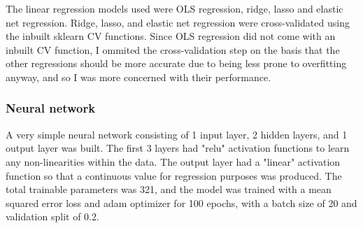\documentclass[11pt]{article}
\begin{document}
The linear regression models used were OLS regression, ridge, lasso and
elastic net regression. Ridge, lasso, and elastic net regression were
cross-validated using the inbuilt sklearn CV functions. Since OLS
regression did not come with an inbuilt CV function, I ommited the
cross-validation step on the basis that the other regressions should be
more accurate due to being less prone to overfitting anyway, and so I
was more concerned with their performance.

\subsubsection{Neural network}

A very simple neural network consisting of 1 input layer, 2 hidden
layers, and 1 output layer was built. The first 3 layers had "relu"
activation functions to learn any non-linearities within the data. The
output layer had a "linear" activation function so that a continuous
value for regression purposes was produced. The total trainable
parameters was 321, and the model was trained with a mean squared error
loss and adam optimizer for 100 epochs, with a batch size of 20 and
validation split of 0.2.
\end{document}
